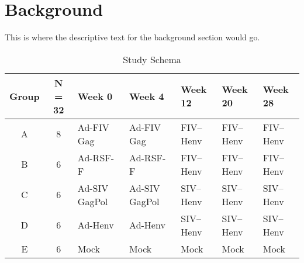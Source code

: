 \section{Background}
This is where the descriptive text for the background section would go.

\begingroup\small
\begin{table}[h]
\centering
\begin{tabular}{ccp{2.8cm}p{2.8cm}p{2.2cm}p{2.2cm}p{2.2cm}}
\hline
Group & N = 32 & Week 0 & Week 4 & Week 12 & Week 20 & Week 28 \\
\hline
A & 8 & Ad-FIV Gag\footnotemark[1] & Ad-FIV Gag\footnotemark[1] & FIV--Henv\footnotemark[2] & FIV--Henv\footnotemark[2] & FIV--Henv\footnotemark[2] \\
B & 6 & Ad-RSF-F\footnotemark[1] & Ad-RSF-F\footnotemark[1] & FIV--Henv\footnotemark[2] & FIV--Henv\footnotemark[2] & FIV--Henv\footnotemark[2] \\
C & 6 & Ad-SIV GagPol\footnotemark[1] & Ad-SIV GagPol\footnotemark[1] &  SIV--Henv\footnotemark[2] &  SIV--Henv\footnotemark[2] &  SIV--Henv\footnotemark[2] \\
D & 6 & Ad-Henv\footnotemark[1] & Ad-Henv\footnotemark[1] &  SIV--Henv\footnotemark[2] &  SIV--Henv\footnotemark[2] &  SIV--Henv\footnotemark[2] \\
E & 6 & Mock & Mock & Mock & Mock & Mock \\
\hline
\end{tabular}
\caption{Study Schema}
\label{schema}
\end{table}
\endgroup
